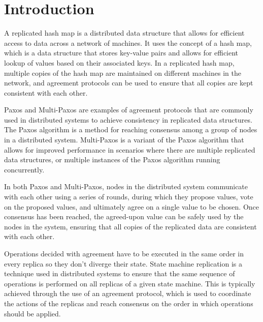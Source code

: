 \documentclass[sigconf]{acmart}
\begin{document}
\maketitle

\section{Introduction}

A replicated hash map is a distributed data structure that allows for efficient access to data across a network of machines. It uses the concept of a hash map, which is a data structure that stores key-value pairs and allows for efficient lookup of values based on their associated keys. In a replicated hash map, multiple copies of the hash map are maintained on different machines in the network, and agreement protocols can be used to ensure that all copies are kept consistent with each other.

Paxos \cite{leslie1998part} \cite{lamport2001paxos} \cite{van2015paxos} and Multi-Paxos \cite{lamport2001paxos} \cite{du2009multi} \cite{van2015paxos} are examples of agreement protocols that are commonly used in distributed systems to achieve consistency in replicated data structures. The Paxos algorithm is a method for reaching consensus among a group of nodes in a distributed system. Multi-Paxos is a variant of the Paxos algorithm that allows for improved performance in scenarios where there are multiple replicated data structures, or multiple instances of the Paxos algorithm running concurrently.

In both Paxos and Multi-Paxos, nodes in the distributed system communicate with each other using a series of rounds, during which they propose values, vote on the proposed values, and ultimately agree on a single value to be chosen. Once consensus has been reached, the agreed-upon value can be safely used by the nodes in the system, ensuring that all copies of the replicated data are consistent with each other.

Operations decided with agreement have to be executed in the same order in every replica so they don't diverge their state. State machine replication is a technique used in distributed systems to ensure that the same sequence of operations is performed on all replicas of a given state machine. This is typically achieved through the use of an agreement protocol, which is used to coordinate the actions of the replicas and reach consensus on the order in which operations should be applied.
\end{document}
